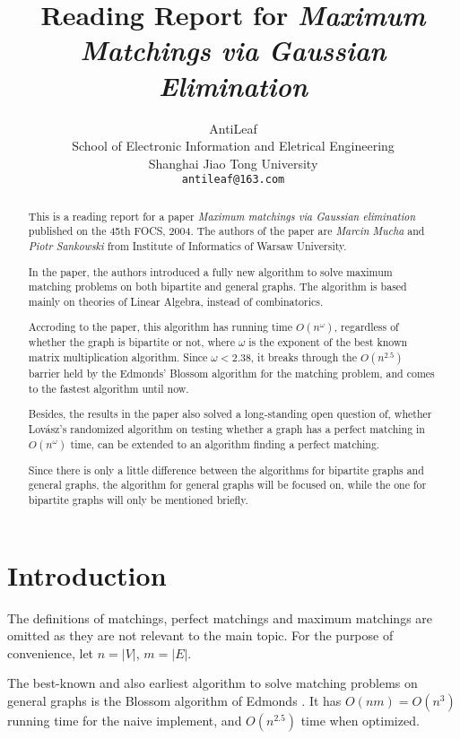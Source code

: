 \documentclass{article}
\title{Reading Report for \emph{Maximum Matchings via Gaussian Elimination}}
\author{%
	AntiLeaf \\
	School of Electronic Information and Eletrical Engineering \\
	Shanghai Jiao Tong University \\
	\texttt{antileaf@163.com} \\
}
\begin{document}
	\maketitle

	\begin{abstract}
		This is a reading report for a paper \emph{Maximum matchings via Gaussian elimination}  published on the 45th FOCS, 2004. The authors of the paper are \textit{Marcin Mucha} and \textit{Piotr Sankowski} from Institute of Informatics of Warsaw University.
			
		In the paper, the authors introduced a fully new algorithm to solve maximum matching problems on both bipartite and general graphs. The algorithm is based mainly on theories of Linear Algebra, instead of combinatorics.

		Accroding to the paper, this algorithm has running time $O(n^\omega)$, regardless of whether the graph is bipartite or not, where $\omega$ is the exponent of the best known matrix multiplication algorithm. Since $\omega < 2.38$, it breaks through the $O(n^{2.5})$ barrier held by the Edmonds' Blossom algorithm for the matching problem, and comes to the fastest algorithm until now.

		Besides, the results in the paper also solved a long-standing open question of, whether Lov\'asz's randomized algorithm on testing whether a graph has a perfect matching in $O(n^\omega)$ time, can be extended to an algorithm finding a perfect matching.

		Since there is only a little difference between the algorithms for bipartite graphs and general graphs, the algorithm for general graphs will be focused on, while the one for bipartite graphs will only be mentioned briefly.
	\end{abstract}

	\section{Introduction}

		The definitions of matchings, perfect matchings and maximum matchings are omitted as they are not relevant to the main topic. For the purpose of convenience, let $n = |V|$, $m = |E|$.

		The best-known and also earliest algorithm to solve matching problems on general graphs is the Blossom algorithm of Edmonds  . It has $O(nm) = O(n^3)$ running time for the naive implement, and $O(n^{2.5})$  time when optimized.
\end{document}
